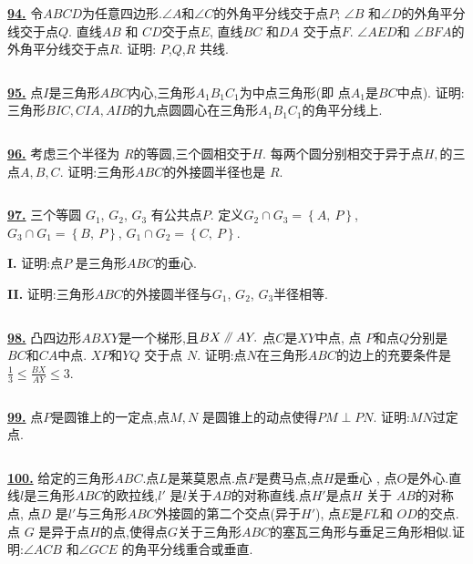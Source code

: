 \documentclass{article}
\newcommand\pxx{%
\mathrel{\text{\tikz[baseline] \draw (0em,-0.3ex) -- (.4em,1.7ex) (.2em,-0.3ex) -- (.6em,1.7ex);}%
}}
\begin{document}
\href{ http://www.artofproblemsolving.com/Forum/viewtopic.php?p=191489#p191489
}{\bf 94.} 令$ABCD$为任意四边形.$\angle A$和$\angle C$的外角平分线交于点$P$; $\angle B$ 和$\angle D$的外角平分线交于点$Q$. 直线$AB$ 和 $CD$交于点$E$, 直线$BC$ 和$DA$ 交于点$F$.  $\angle AED$和 $\angle BFA$的外角平分线交于点$R$. 证明: $P$,$Q$,$R$ 共线.

$$ $$


\href{http://www.artofproblemsolving.com/Forum/viewtopic.php?p=190783#p190783
 }{\bf 95.} 点$I$是三角形$ABC$内心,三角形$A_1B_1C_1$为中点三角形(即 点$A_1$是$BC$中点). 证明:三角形$BIC, CIA, AIB$的九点圆圆心在三角形$A_1B_1C_1$的角平分线上.

$$ $$

\href{http://www.artofproblemsolving.com/Forum/viewtopic.php?p=190783#p190783
 }{\bf 96.} 考虑三个半径为 $R$的等圆,三个圆相交于$H.$ 每两个圆分别相交于异于点$H,$的三点$A, B, C.$ 证明:三角形$ABC$的外接圆半径也是 $R.$

$$ $$


\href{ http://www.artofproblemsolving.com/Forum/viewtopic.php?p=6461#p6461
}{\bf 97.} 三个等圆 $G_{1}$, $G_{2}$, $G_{3}$ 有公共点$P$.
定义$G_{2}\cap G_{3}=\left\{A,\ P\right\}$, $G_{3}\cap G_{1}=\left\{B,\ P\right\}$, $G_{1}\cap G_{2}=\left\{C,\ P\right\}$.

{\bf I.} 证明:点$P$ 是三角形$ABC$的垂心.

{\bf II.} 证明:三角形$ABC$的外接圆半径与$G_{1}$, $G_{2}$, $G_{3}$半径相等.


$$ $$

\href{http://www.artofproblemsolving.com/Forum/viewtopic.php?p=235599#p235599
 }{\bf 98.} 凸四边形$ABXY$是一个梯形,且$BX \pxx AY.$ 点$C$是$XY$中点, 点 $P$和点$Q$分别是 $BC$和$CA$中点. $XP$和$YQ$ 交于点 $N.$ 证明:点$N$在三角形$ ABC$的边上的充要条件是 $\displaystyle \frac13\leq\frac{BX}{AY}\leq 3$.


$$ $$

\href{ http://www.artofproblemsolving.com/Forum/viewtopic.php?p=117045#p117045
}{\bf 99.} 点$P$是圆锥上的一定点,点$M,N$ 是圆锥上的动点使得$PM\perp PN$. 证明:$MN$过定点.

$$ $$

\href{ http://www.artofproblemsolving.com/Forum/viewtopic.php?p=239221#p239221
}{\bf 100.} 给定的三角形$ABC$.点$L$是莱莫恩点.点$F$是费马点,点$H$是垂心 , 点$O$是外心.直线$l$是三角形$ABC$的欧拉线,$l'$ 是$l$关于$AB$的对称直线.点$H'$是点$H$ 关于 $AB$的对称点, 点$D$ 是$l'$与三角形$ABC$外接圆的第二个交点(异于$H'$), 点$E$是$FL$和 $OD$的交点. 点 $G$ 是异于点$H$的点,使得点$G$关于三角形$ABC$的塞瓦三角形与垂足三角形相似.证明:$\angle ACB$ 和$\angle GCE$ 的角平分线重合或垂直.
\end{document}
